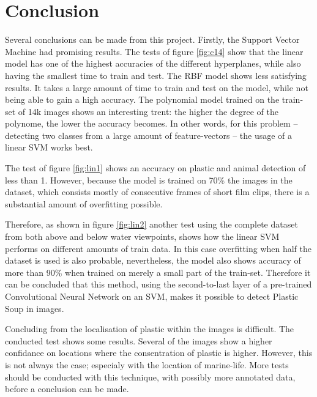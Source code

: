 \section{Conclusion}
\label{sec:Conclusion}
Several conclusions can be made from this project.
Firstly, the Support Vector Machine had promising results.
The tests of figure \ref{fig:c14} show that the linear model has one of the highest accuracies of the different hyperplanes, while also having the smallest time to train and test.
The RBF model shows less satisfying results.
It takes a large amount of time to train and test on the model, while not being able to gain a high accuracy.
The polynomial model trained on the train-set of 14k images shows an interesting trent: the higher the degree of the polynome, the lower the accuracy becomes.
In other words, for this problem -- detecting two classes from a large amount of feature-vectors -- the usage of a linear SVM works best.

The test of figure \ref{fig:lin1} shows an accuracy on plastic and animal detection of less than 1\permil.
However, because the model is trained on 70\% the images in the dataset, which consists mostly of consecutive frames of short film clips, there is a substantial amount of overfitting possible.

Therefore, as shown in figure \ref{fig:lin2} another test using the complete dataset from both above and below water viewpoints, shows how the linear SVM performs on different amounts of train data.
In this case overfitting when half the dataset is used is also probable, nevertheless, the model also shows accuracy of more than 90\% when trained on merely a small part of the train-set.
Therefore it can be concluded that this method, using the second-to-last layer of a pre-trained Convolutional Neural Network on an SVM, makes it possible to detect Plastic Soup in images.

Concluding from the localisation of plastic within the images is difficult.
The conducted test shows some results.
Several of the images show a higher confidance on locations where the consentration of plastic is higher.
However, this is not always the case; especialy with the location of marine-life.
More tests should be conducted with this technique, with possibly more annotated data, before a conclusion can be made.

